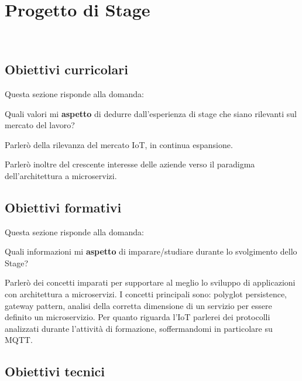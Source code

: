 
\chapter{Progetto di Stage}
\label{cap:processi-metodologie}

\\

\section{Obiettivi curricolari}

Questa sezione risponde alla domanda:

Quali valori mi \textbf{aspetto} di dedurre dall'esperienza di stage che siano rilevanti sul mercato del lavoro?

Parlerò della rilevanza del mercato IoT, in continua espansione.

Parlerò inoltre del crescente interesse delle aziende verso il paradigma dell'architettura a microservizi.


\section{Obiettivi formativi}

Questa sezione risponde alla domanda:

Quali informazioni mi \textbf{aspetto} di imparare/studiare durante lo svolgimento dello Stage?

Parlerò dei concetti imparati per supportare al meglio lo sviluppo di applicazioni con architettura a microservizi.
I concetti principali sono: polyglot persistence, gateway pattern, analisi della corretta dimensione di un servizio per essere definito un microservizio.
Per quanto riguarda l'IoT parlerei dei protocolli analizzati durante l'attività di formazione, soffermandomi in particolare su MQTT.


\section{Obiettivi tecnici}


